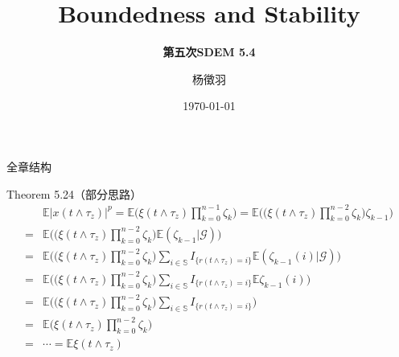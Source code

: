 \documentclass[10pt,aspectratio=43]{beamer}
\title{Boundedness and Stability}
\subtitle{\fontsize{9pt}{14pt}\textbf{第五次\quad SDEM 5.4}}
\author{杨徵羽}
\date{\today}
\begin{document}
\frame{\titlepage}

\begin{frame}{全章结构}
\begin{table}[htbp]%
{}
\end{table}
\end{frame}

\begin{frame}{Theorem 5.24（部分思路）}
\setcounter{equation}{0}
\fontsize{7.5}{0}\selectfont
\begin{align}
&\mathbb{E}|x(t\wedge\tau_z)|^p=\mathbb{E}\Bigg(\xi(t\wedge\tau_z)\prod_{k=0}^{n-1}\zeta_k\Bigg)=\mathbb{E}\Bigg(\bigg(\xi(t\wedge\tau_z)\prod_{k=0}^{n-2}\zeta_k\bigg)\zeta_{k-1}\Bigg)\\
={}&\mathbb{E}\Bigg(\bigg(\xi(t\wedge\tau_z)\prod_{k=0}^{n-2}\zeta_k\bigg)\mathbb{E}(\zeta_{k-1}|\mathcal{G})\Bigg)\\
={}&\mathbb{E}\Bigg(\bigg(\xi(t\wedge\tau_z)\prod_{k=0}^{n-2}\zeta_k\bigg)\sum_{i\in\mathbb{S}}I_{\{r(t\wedge\tau_z)=i\}}\mathbb{E}(\zeta_{k-1}(i)|\mathcal{G})\Bigg)\\
={}&\mathbb{E}\Bigg(\bigg(\xi(t\wedge\tau_z)\prod_{k=0}^{n-2}\zeta_k\bigg)\sum_{i\in\mathbb{S}}I_{\{r(t\wedge\tau_z)=i\}}\mathbb{E}\zeta_{k-1}(i)\Bigg)\\
={}&\mathbb{E}\Bigg(\bigg(\xi(t\wedge\tau_z)\prod_{k=0}^{n-2}\zeta_k\bigg)\sum_{i\in\mathbb{S}}I_{\{r(t\wedge\tau_z)=i\}}\Bigg)\\
={}&\mathbb{E}\Bigg(\xi(t\wedge\tau_z)\prod_{k=0}^{n-2}\zeta_k\Bigg)\\
={}&\cdots=\mathbb{E}\xi(t\wedge\tau_z)
\end{align}
\fontsize{10}{0}\selectfont
\end{frame}
\end{document}
